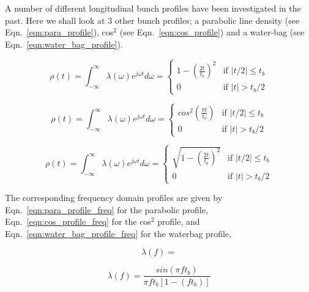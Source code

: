 A number of different longitudinal bunch profiles have been investigated in the past. Here we shall look at 3 other bunch profiles; a parabolic line density (see Eqn.~\ref{eqn:para_profile}), cos$^{2}$ (see Eqn.~\ref{eqn:cos_profile}) and a water-bag (see Eqn.~\ref{eqn:water_bag_profile}).

\begin{equation}
\rho\left( t \right) = \int^{\infty}_{-\infty} \lambda \left( \omega \right) e^{j\omega t} d\omega = 
\begin{cases}1-\left( \frac{2t} {t_{b}} \right)^{2} &\textrm{if $| t/2 | \leq t_{b}$}\\
0								&\textrm{if $| t | > t_{b}/2$}
\end{cases}
\label{eqn:para_profile}
\end{equation}

\begin{equation}
\rho\left( t \right) = \int^{\infty}_{-\infty} \lambda \left( \omega \right) e^{j\omega t} d\omega = 
\begin{cases}
cos^{2}\left( \frac{\pi t} {t_{b}} \right) &\textrm{if $| t/2 | \leq t_{b}$}\\
0								&\textrm{if $| t | > t_{b}/2$}
\end{cases}
\label{eqn:cos_profile}
\end{equation}

\begin{equation}
\rho\left( t \right) = \int^{\infty}_{-\infty} \lambda \left( \omega \right) e^{j\omega t} d\omega = 
\begin{cases}
\sqrt{1-\left( \frac{2t}{t_{b}}\right)^{2}} &\textrm{if $| t/2 | \leq t_{b}$}\\
0								&\textrm{if $| t | > t_{b}/2$}
\end{cases}
\label{eqn:water_bag_profile}
\end{equation}

The corresponding frequency domain profiles are given by Eqn.~\ref{eqn:para_profile_freq} for the parabolic profile, Eqn.~\ref{eqn:cos_profile_freq} for the cos$^{2}$ profile, and Eqn.~\ref{eqn:water_bag_profile_freq} for the waterbag profile,

\begin{equation}
 \lambda \left( f \right) = 
\label{eqn:para_profile_freq}
\end{equation}

\begin{equation}
\lambda \left( f \right)  = \frac{sin \left( \pi f t_{b} \right)}{\pi f t_{b} \left[ 1 - \left( f t_{b} \right) \right]}
\label{eqn:cos_profile_freq}
\end{equation}

